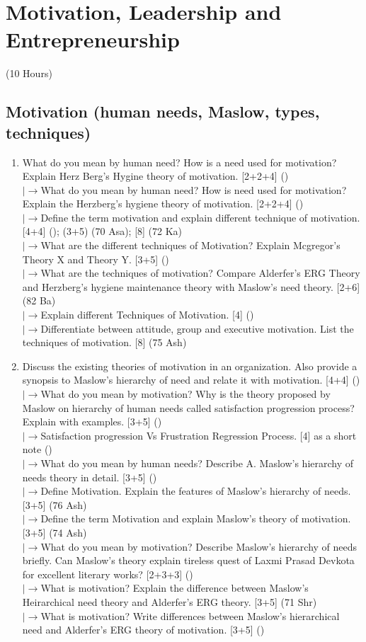 \documentclass[12pt]{article}
\newcommand{\lb}{\\$\left|\rightarrow\right.$}
\begin{document}
\pagebreak
\section{Motivation, Leadership and Entrepreneurship}
\begin{center}(10 Hours)\end{center}

  \subsection{Motivation (human needs, Maslow, types, techniques)}
    \begin{enumerate}[topsep=0pt, noitemsep]
      \item What do you mean by human need? How is a need used for motivation? Explain Herz Berg's Hygine theory of motivation. \hfill [2+2+4] ()
        \lb What do you mean by human need? How is need used for motivation? Explain the Herzberg's hygiene theory of motivation. \hfill [2+2+4] ()
        \lb Define the term motivation and explain different technique of motivation. \hfill [4+4] (); (3+5) (70 Asa); [8] (72 Ka)
        \lb What are the different techniques of Motivation? Explain Mcgregor's Theory X and Theory Y. \hfill [3+5] ()
        \lb What are the techniques of motivation? Compare Alderfer's ERG Theory and Herzberg's hygiene maintenance theory with Maslow's need theory. \hfill [2+6] (82 Ba)
        \lb Explain different Techniques of Motivation. \hfill [4] ()
        \lb Differentiate between attitude, group and executive motivation. List the techniques of motivation. \hfill [8] (75 Ash)

      \item Discuss the existing theories of motivation in an organization. Also provide a synopsis to Maslow's hierarchy of need and relate it with motivation. \hfill [4+4] ()
        \lb What do you mean by motivation? Why is the theory proposed by Maslow on hierarchy of human needs called satisfaction progression process? Explain with examples. \hfill [3+5] ()
        \lb Satisfaction progression Vs Frustration Regression Process. \hfill [4] as a short note ()
        \lb What do you mean by human needs? Describe A. Maslow's hierarchy of needs theory in detail. \hfill [3+5] ()
        \lb Define Motivation. Explain the features of Maslow's hierarchy of needs. \hfill [3+5] (76 Ash)
        \lb Define the term Motivation and explain Maslow's theory of motivation. \hfill [3+5] (74 Ash)
        \lb What do you mean by motivation? Describe Maslow's hierarchy of needs briefly. Can Maslow's theory explain tireless quest of Laxmi Prasad Devkota for excellent literary works? \hfill [2+3+3] ()
        \lb What is motivation? Explain the difference between Maslow's Heirarchical need theory and Alderfer's ERG theory. \hfill [3+5] (71 Shr)
        \lb What is motivation? Write differences between Maslow's hierarchical need and Alderfer's ERG theory of motivation. \hfill [3+5] ()


\end{enumerate}
\end{document}
